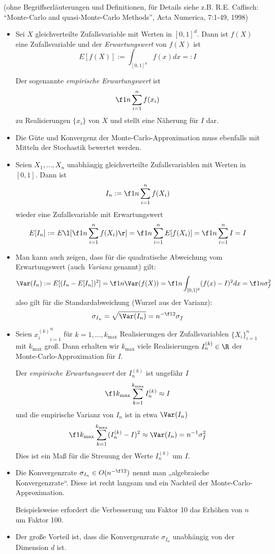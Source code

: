 \documentclass[11pt]{scrbook}
\begin{document}
(ohne Begriffserläuterungen und Definitionen, für Details siehe z.B. R.E. Caflisch: “Monte-Carlo and quasi-Monte-Carlo Methods”, Acta Numerica, 7:1-49, 1998)

\begin{itemize}
	\item
		Sei $X$ gleichverteilte Zufallsvariable mit Werten in $[0,1]^d$.
		Dann ist $f(X)$ eine Zufallsvariable und der \emph{Erwartungswert} von $f(X)$ ist
		\[
			E[f(X)] := \int_{[0,1]^d} f(x) dx =: I
		\]

		Der sogenannte \emph{empirische Erwartungswert} ist
		\[
			\f 1n \sum_{i=1}^n f(x_i)
		\]
		zu Realisierungen $\{x_i\}$ von $X$ und stellt eine Näherung für $I$ dar.
	\item
		Die Güte und Konvergenz der Monte-Carlo-Approximation muss ebenfalls mit Mitteln der Stochastik bewertet werden.
	\item
		Seien $X_1, \dotsc, X_n$ unabhängig gleichverteilte Zufallsvariablen mit Werten in $[0,1]$.
		Dann ist
		\[
			I_n := \f 1n \sum_{i=1}^n f(X_i)
		\]
		wieder eine Zufallsvariable mit Erwartungswert
		\[
			E[I_n] := E\l[\f 1n \sum_{i=1}^n f(X_i)\r] = \f 1n \sum_{i=1}^n E[f(X_i)] = \f 1n \sum_{i=1}^n I = I
		\]
	\item
		Man kann auch zeigen, dass für die quadratische Abweichung vom Erwartungswert (auch \emph{Varianz} genannt) gilt:
		\[
			\Var(I_n) := E[(I_n-E[I_n])^2] = \f 1n \Var(f(X)) = \f 1n \int_{[0,1]^d} (f(x) - I)^2 dx = \f 1n \sigma_f^2
		\]
		also gilt für die Standardabweichung (Wurzel aus der Varianz):
		\[
			\sigma_{I_n} = \sqrt{\Var(I_n)} = n^{-\f 12} \sigma_f
		\]
	\item
		Seien ${x_i^{(k)}}_{i=1}^n$ für $k=1,\dotsc, k_{\text{max}}$ Realisierungen der Zufallsvariablen $\{X_i\}_{i=1}^n$ mit $k_{\text{max}}$ groß.
		Dann erhalten wir $k_{\text{max}}$ viele Realisierungen $I_n^{(k)}\in \R$ der Monte-Carlo-Approximation für $I$.

		Der \emph{empirische Erwartungswert} der $I_n^{(k)}$ ist ungefähr $I$
		\[
			\f 1{k_{\text{max}}} \sum_{k=1}^{k_{\text{max}}} I_n^{(k)} \approx I
		\]
		und die empirische Varianz von $I_n$ ist in etwa $\Var(I_n)$
		\[
			\f 1{k_{\text{max}}} \sum_{k=1}^{k_{\text{max}}}(I_n^{(k)} - I)^2 \approx \Var(I_n) = n^{-1} \sigma_f^2
		\]
		Dies ist ein Maß für die Streuung der Werte $I_n^{(k)}$ um $I$.
	\item
		Die Konvergenzrate $\sigma_{I_n} \in O(n^{-\f 12})$ nennt man „algebraische Konvergenzrate“.
		Diese ist recht langsam und ein Nachteil der Monte-Carlo-Approximation.
		
		Beispielsweise erfordert die Verbesserung um Faktor 10 das Erhöhen von $n$ um Faktor 100.
	\item
		Der große Vorteil ist, dass die Konvergenzrate $\sigma_{I_n}$ unabhängig von der Dimension $d$ ist.
\end{itemize}
\end{document}

